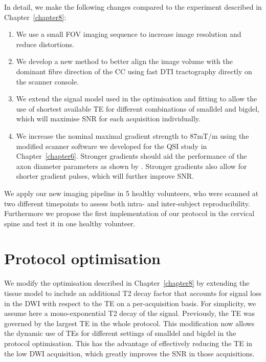 In detail, we make the following changes compared to the \SFasym{} experiment described in Chapter~\ref{chapter8}:
\begin{enumerate}
\item We use a small \gls{FOV} imaging sequence to increase image resolution and reduce distortions.
\item We develop a new method to better align the image volume with the dominant fibre direction of the \gls{CC} using fast DTI tractography directly on the scanner console.
\item We extend the signal model used in the optimisation and fitting to allow the use of shortest available \gls{TE} for different combinations of \gls{smalldel} and \gls{bigdel}, which will maximise \gls{SNR} for each acquisition individually.
\item We increase the nominal maximal gradient strength to 87mT/m using the modified scanner software we developed for the QSI study in Chapter~\ref{chapter6}. Stronger gradients should aid the performance of the axon diameter parameters as shown by \citet{Dyrby:2010}. Stronger gradients also allow for shorter gradient pulses, which will further improve \gls{SNR}.
\end{enumerate}
We apply our new imaging pipeline in 5 healthy volunteers, who were scanned at two different timepoints to assess both intra- and inter-subject reproducibility. Furthermore we propose the first implementation of our \SFasym{} protocol in the cervical spine and test it in one healthy volunteer. 


\section{Protocol optimisation}
We modify the \SFasym{} optimisation described in Chapter~\ref{chapter8} by extending the tissue model to include an additional T2 decay factor that accounts for signal loss in the DWI with respect to the \gls{TE} on a per-acquisition basis. For simplicity, we assume here a mono-exponential T2 decay of the signal. Previously, the \gls{TE} was governed by the largest TE in the whole protocol. This modification now allows the dynamic use of \glspl{TE} for different settings of \gls{smalldel} and \gls{bigdel} in the protocol optimisation. This has the advantage of effectively reducing the \gls{TE} in the low DWI acquisition, which greatly improves the \gls{SNR} in those acquisitions.

